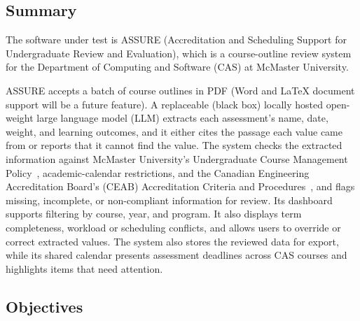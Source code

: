 \documentclass[12pt, titlepage]{article}
\begin{document}
\subsection{Summary}

The software under test is ASSURE (Accreditation and Scheduling Support for Undergraduate Review and Evaluation), which is a course-outline review system for the Department of Computing and Software (CAS) at McMaster University.

ASSURE accepts a batch of course outlines in PDF (Word and LaTeX document support will be a future feature). A replaceable (black box) locally hosted open-weight large language model (LLM) extracts each assessment's name, date, weight, and learning outcomes, and it either cites the passage each value came from or reports that it cannot find the value. The system checks the extracted information against McMaster University's Undergraduate Course Management Policy~\citep{McMasterUCMP2025}, academic-calendar restrictions, and the Canadian Engineering Accreditation Board's (CEAB) Accreditation Criteria and Procedures~\citep{CEAB2025}, and flags missing, incomplete, or non-compliant information for review. Its dashboard supports filtering by course, year, and program. It also displays term completeness, workload or scheduling conflicts, and allows users to override or correct extracted values. The system also stores the reviewed data for export, while its shared calendar presents assessment deadlines across CAS courses and highlights items that need attention.

\subsection{Objectives}



\end{document}
